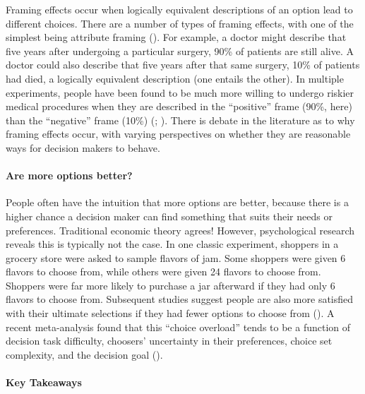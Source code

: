 \documentclass[
]{krantz}
\begin{document}
Framing effects occur when logically equivalent descriptions of an option lead to different choices. There are a number of types of framing effects, with one of the simplest being attribute framing (). For example, a doctor might describe that five years after undergoing a particular surgery, 90\% of patients are still alive. A doctor could also describe that five years after that same surgery, 10\% of patients had died, a logically equivalent description (one entails the other). In multiple experiments, people have been found to be much more willing to undergo riskier medical procedures when they are described in the ``positive'' frame (90\%, here) than the ``negative'' frame (10\%) (; ). There is debate in the literature as to why framing effects occur, with varying perspectives on whether they are reasonable ways for decision makers to behave.

\paragraph*{Are more options better?}\label{are-more-options-better}

People often have the intuition that more options are better, because there is a higher chance a decision maker can find something that suits their needs or preferences. Traditional economic theory agrees! However, psychological research reveals this is typically not the case. In one classic experiment, shoppers in a grocery store were asked to sample flavors of jam. Some shoppers were given 6 flavors to choose from, while others were given 24 flavors to choose from. Shoppers were far more likely to purchase a jar afterward if they had only 6 flavors to choose from. Subsequent studies suggest people are also more satisfied with their ultimate selections if they had fewer options to choose from (). A recent meta-analysis found that this ``choice overload'' tends to be a function of decision task difficulty, choosers' uncertainty in their preferences, choice set complexity, and the decision goal ().

\paragraph*{Key Takeaways}\label{key-takeaways-8}
\end{document}
